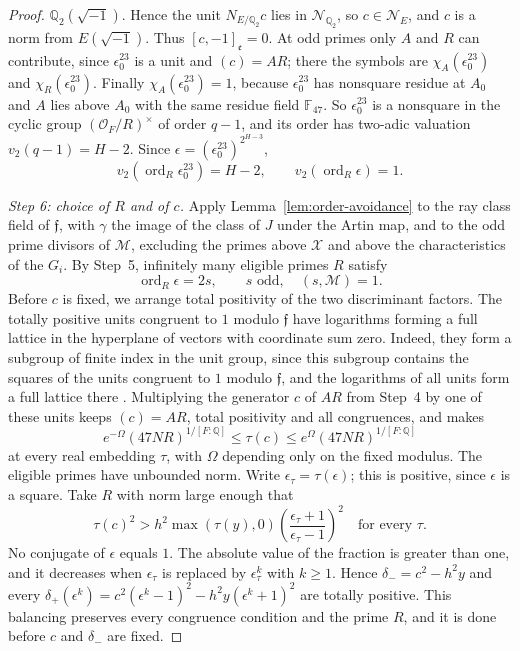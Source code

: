 \documentclass[11pt]{article}
\theoremstyle{plain}
\theoremstyle{definition}
\theoremstyle{remark}
\DeclareMathOperator{\ord}{ord}
\newcommand{\Q}{\mathbb Q}
\newcommand{\F}{\mathbb F}
\newcommand{\OO}{\mathcal O}
\begin{document}
\begin{proof}
$\Q_2(\sqrt{-1})$.  Hence the unit $N_{E/\Q_2}c$ lies in
$\mathcal N_{\Q_2}$, so $c\in\mathcal N_E$, and $c$ is a norm from
$E(\sqrt{-1})$.  Thus $[c,-1]_{\mathfrak e}=0$.  At odd primes only $A$ and $R$ can
contribute, since $\epsilon_0^{23}$ is a unit and $(c)=AR$; there the
symbols are $\chi_A(\epsilon_0^{23})$ and $\chi_R(\epsilon_0^{23})$.
Finally $\chi_A(\epsilon_0^{23})=1$, because $\epsilon_0^{23}$ has
nonsquare residue at $A_0$ and $A$ lies above $A_0$ with the same residue
field $\F_{47}$.  So $\epsilon_0^{23}$ is a nonsquare in the cyclic group
$(\OO_F/R)^\times$ of order $q-1$, and its order has two-adic valuation
$v_2(q-1)=H-2$.  Since $\epsilon=(\epsilon_0^{23})^{2^{H-3}}$,
\[
 v_2(\ord_R\epsilon_0^{23})=H-2,\qquad v_2(\ord_R\epsilon)=1.
\]

\emph{Step 6: choice of $R$ and of $c$.}  Apply
Lemma~\ref{lem:order-avoidance} to the ray class field of $\mathfrak f$,
with $\gamma$ the image of the class of $J$ under the Artin map,
and to the odd prime divisors of $\mathcal M$, excluding the primes above
$\mathcal X$ and above the characteristics of the $G_i$.  By Step~5,
infinitely many eligible primes $R$ satisfy
\begin{equation}\label{eq:exponent-compatibility}
 \ord_R\epsilon=2s,\qquad s\text{ odd},\quad (s,\mathcal M)=1.
\end{equation}
Before $c$ is fixed, we arrange total positivity of the two discriminant
factors.  The totally positive units congruent to $1$ modulo $\mathfrak
f$ have logarithms forming a full lattice in the hyperplane of vectors
with coordinate sum zero.  Indeed, they form a subgroup of finite index
in the unit group, since this subgroup contains the squares of the units
congruent to $1$ modulo $\mathfrak f$, and the logarithms of all units
form a full lattice there \cite[Theorem~5.9]{MilneANT}.  Multiplying the
generator $c$ of $AR$ from Step~4 by one of these units keeps $(c)=AR$,
total positivity and all congruences, and makes
\[
 e^{-\Omega}(47NR)^{1/[F:\Q]}\le\tau(c)
 \le e^\Omega(47NR)^{1/[F:\Q]}
\]
at every real embedding $\tau$, with $\Omega$ depending only on the fixed
modulus.  The eligible primes have unbounded norm.  Write
$\epsilon_\tau=\tau(\epsilon)$; this is positive, since $\epsilon$ is a
square.  Take $R$ with norm large enough that
\begin{equation}\label{eq:positive-factors}
 \tau(c)^2>
 h^2\max(\tau(y),0)
 \left(\frac{\epsilon_\tau+1}{\epsilon_\tau-1}\right)^2
 \quad\text{for every }\tau.
\end{equation}
No conjugate of $\epsilon$ equals $1$.  The absolute value of the fraction
is greater than one, and it decreases when $\epsilon_\tau$ is replaced by
$\epsilon_\tau^k$ with $k\ge1$.  Hence $\delta_-=c^2-h^2y$ and every
$\delta_+(\epsilon^k)=c^2(\epsilon^k-1)^2-h^2y(\epsilon^k+1)^2$ are totally
positive.  This balancing preserves every congruence condition and the
prime $R$, and it is done before $c$ and $\delta_-$ are fixed.


\end{proof}
\end{document}
